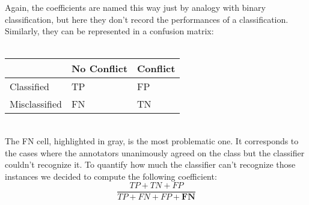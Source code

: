 Again, the coefficients are named this way just by analogy with binary classification, but here they don't record the performances of a classification. Similarly, they can be represented in a confusion matrix:
\\
\\
\begin{table}[H]
\centering
\begin{tabular}{|l|l|l|}
\hline
              & No Conflict                & Conflict \\ \hline
Classified    & TP                         & FP       \\ \hline
Misclassified & \cellcolor[HTML]{9B9B9B}FN & TN       \\ \hline
\end{tabular}
\end{table}
\\

The FN cell, highlighted in gray, is the most problematic one. It corresponds to the cases where the annotators unanimously agreed on the class but the classifier couldn’t recognize it. To quantify how much the classifier can't recognize those instances we decided to compute the following coefficient:
\begin{equation*}
\frac{TP + TN + FP}{TP + FN + FP + \textbf{FN}}
\end{equation*}

